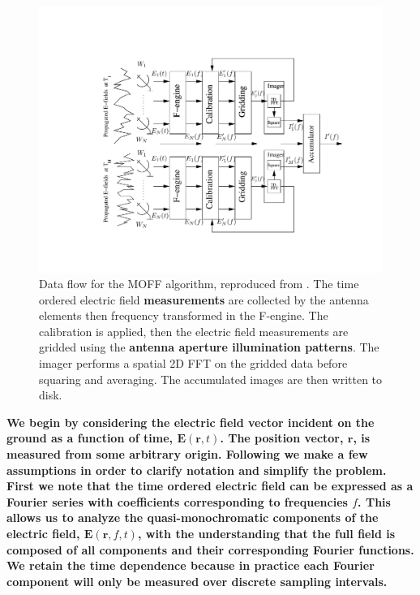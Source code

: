 \documentclass[a4paper,fleqn,usenatbib]{../mnras}
\begin{document}
\begin{figure}
\begin{center}
\includegraphics[width=\columnwidth]{fig1.pdf}
\caption{Data flow for the MOFF algorithm, reproduced from \citealt{thy15c}. The time ordered 
electric field \textbf{measurements} are collected by the antenna elements then frequency transformed in the 
F-engine. The calibration is applied, then the electric field measurements are gridded using the 
\textbf{antenna aperture illumination patterns}. The imager performs a spatial 2D FFT on the gridded data before 
squaring and averaging. The accumulated images are then written to disk.}
\label{fig:moff_flow}
\end{center}
\end{figure}

\textbf{We begin by considering the electric field vector incident on the ground as a function of time, 
$\mathbf{E}(\mathbf{r},t)$. The position vector, $\mathbf{r}$, is measured from some arbitrary 
origin. Following \citealt{cla99} we make a few assumptions in order to clarify notation and 
simplify the problem. First we note that the time ordered electric field can be expressed as a 
Fourier series with coefficients corresponding to frequencies $f$. This allows us to analyze the 
quasi-monochromatic components of the electric field, $\mathbf{E}(\mathbf{r},f,t)$, with the 
understanding that the full field is composed of all components and their corresponding Fourier 
functions. We retain the time dependence because in practice each Fourier component will only be 
measured over discrete sampling intervals. }
\end{document}
